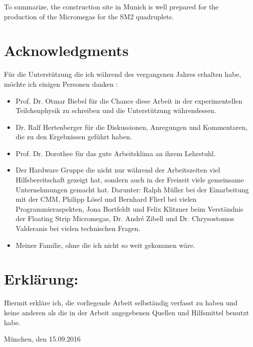 \documentclass[
a4paper,                                %
twoside,                                %
BCOR1.4cm,                      %
10pt,                           %
headings=normal,                %
headsepline,                    %
clearplainpage, %
final,                                  %
div=14,
parskip=full,
openright,
bibliography=toc
]{scrreprt}
\begin{document}
To summarize, the construction site in Munich is well prepared for the production of the Micromegas for the SM2 quadruplets.


%
{}
%

\chapter*{Acknowledgments}

F\"ur die Unterst\"utzung die ich w\"ahrend des vergangenen Jahres erhalten habe, m\"ochte ich einigen Personen danken :

\begin{itemize}
 \item 
 	Prof. Dr. Otmar Biebel f\"ur die Chance diese Arbeit in der experimentellen Teilchenphysik zu schreiben und die Unterst\"utzung w\"ahrendessen.
 \item 
 	Dr. Ralf Hertenberger f\"ur die Diskussionen, Anregungen und Kommentaren, die zu den Ergebnissen gef\"uhrt haben.
 \item
 	Prof. Dr. Dorothee f\"ur das gute Arbeitsklima an ihrem Lehrstuhl.
 \item
 	Der Hardware Gruppe die nicht nur w\"ahrend der Arbeitszeiten viel Hilfsbereitschaft gezeigt hat, sondern auch in der Freizeit viele gemeinsame Unternehmungen gemacht hat. Darunter: Ralph M\"uller bei der Einarbeitung mit der CMM, Philipp L\"osel und Bernhard Flierl bei vielen Programmieraspekten, Jona Bortfeldt und Felix Klitzner beim Verst\"andnis der Floating Strip Micromegas, Dr. Andr\'{e} Zibell und Dr. Chrysostomos Valderanis bei vielen technischen Fragen.
 \item
 	Meiner Familie, ohne die ich nicht so weit gekommen w\"are.
\end{itemize}

\thispagestyle{empty}

\chapter*{Erkl\"arung:}

Hiermit erkl\"are ich, die vorliegende Arbeit selbst\"andig verfasst zu haben und keine anderen als die in der Arbeit angegebenen Quellen und Hilfsmittel benutzt habe.

\vspace{25mm}

M\"unchen, den 15.09.2016

\thispagestyle{empty}
\end{document}
